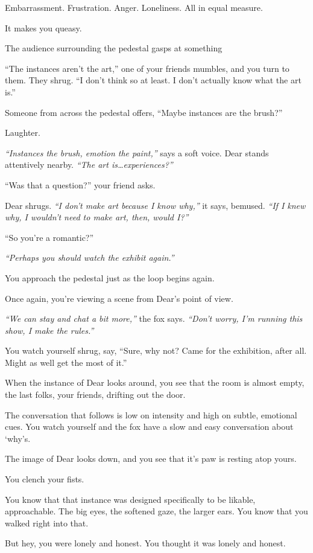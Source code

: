Embarrassment. Frustration. Anger. Loneliness. All in equal measure.

It makes you queasy.

The audience surrounding the pedestal gasps at something

``The instances aren't the art,'' one of your friends mumbles, and you turn to them. They shrug. ``I don't think so at least. I don't actually know what the art is.''

Someone from across the pedestal offers, ``Maybe instances are the brush?''

Laughter.

\emph{``Instances the brush, emotion the paint,''} says a soft voice. Dear stands attentively nearby. \emph{``The art is\ldots{}experiences?''}

``Was that a question?'' your friend asks.

Dear shrugs. \emph{``I don't make art because I know why,''} it says, bemused. \emph{``If I knew why, I wouldn't need to make art, then, would I?''}

``So you're a romantic?''

\emph{``Perhaps you should watch the exhibit again.''}

You approach the pedestal just as the loop begins again.

Once again, you're viewing a scene from Dear's point of view.

\emph{``We can stay and chat a bit more,''} the fox says. \emph{``Don't worry, I'm running this show, I make the rules.''}

You watch yourself shrug, say, ``Sure, why not? Came for the exhibition, after all. Might as well get the most of it.''

When the instance of Dear looks around, you see that the room is almost empty, the last folks, your friends, drifting out the door.

The conversation that follows is low on intensity and high on subtle, emotional cues. You watch yourself and the fox have a slow and easy conversation about `why's.

The image of Dear looks down, and you see that it's paw is resting atop yours.

You clench your fists.

You know that that instance was designed specifically to be likable, approachable. The big eyes, the softened gaze, the larger ears. You know that you walked right into that.

But hey, you were lonely and honest. You thought it was lonely and honest.

